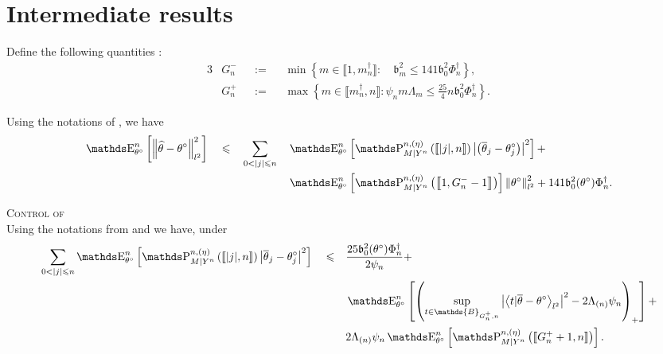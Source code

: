 \section{Intermediate results}

\begin{de}\label{DED.5.1}
Define the following quantities :
\begin{alignat*}{3}
& G_{n}^{-} &&:=&& \min\left\{m \in \llbracket 1, m_{n}^{\dagger} \rrbracket : \quad \mathfrak{b}_{m}^{2} \leq 141 \mathfrak{b}_{0}^{2} \Phi^{\dagger}_{n}\right\},\\
& G_{n}^{+} &&:=&& \max \left\{m \in \llbracket m_{n}^{\dagger}, n \rrbracket : \psi_{n} m \Lambda_{m} \leq \frac{25}{4} n \mathfrak{b}_{0}^{2} \Phi_{n}^{\dagger} \right\}.
\end{alignat*}
\end{de}

\begin{pr}\label{PRD.5.1}
Using the notations of , we have
\begin{alignat}{4}
& \E_{\theta^{\circ}}^{n}\left[\left\Vert \widehat{\theta} - \theta^{\circ}\right\Vert_{l^{2}}^{2}\right] && \leq && \sum\limits_{0 < \vert j \vert \leq n}&& \E_{\theta^{\circ}}^{n}\left[\P_{M \vert Y^{n}}^{n, (\eta)} \left(\llbracket \vert j \vert, n \rrbracket\right) \left\vert  \left(\overline{\theta}_{j} - \theta^{\circ}_{j}\right) \right\vert^{2}\right] + \label{EQD.26}\\
& && && && \E_{\theta^{\circ}}^{n}\left[\P_{M \vert Y^{n}}^{n, (\eta)} \left(\left\llbracket 1, G^{-}_{n} - 1\right\rrbracket \right) \right] \left\Vert \theta^{\circ} \right\Vert_{l^{2}}^{2} + 141 \mathfrak{b}_{0}^{2}(\theta^{\circ}) \Phi^{\dagger}_{n}. \label{EQD.27}
\end{alignat}

\end{pr}

\begin{pr}{\textsc{Control of } \\}\label{PRD.5.2}
Using the notations from  and  we have, under 
\begin{alignat}{3}
& \sum\limits_{0 < \vert j \vert \leq n} \E_{\theta^{\circ}}^{n}\left[\P_{M \vert Y^{n}}^{n, (\eta)} \left(\llbracket \vert j \vert, n \rrbracket \right) \left\vert  \overline{\theta}_{j} - \theta^{\circ}_{j} \right\vert^{2}\right] && \leq && \frac{25 \mathfrak{b}_{0}^{2}(\theta^{\circ}) \Phi^{\dagger}_{n}}{2 \psi_{n}} + \notag\\
& && && \E_{\theta^{\circ}}^{n}\left[ \left(\sup\limits_{t \in \mathds{B}_{G^{+}_{n}, n}} \left\vert\left\langle t \vert \overline{\theta} - \theta^{\circ}\right\rangle_{l^{2}} \right\vert^{2} - 2 \Lambda_{(n)} \psi_{n} \right)_{+} \right]+\notag\\
& && && 2 \Lambda_{(n)} \psi_{n} \E_{\theta^{\circ}}^{n}\left[ \P_{M \vert Y^{n}}^{n, (\eta)}\left(\llbracket G^{+}_{n} + 1, n \rrbracket\right)\right]\label{EQD.28}.
\end{alignat}
\end{pr}

